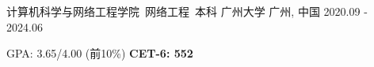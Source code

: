 

\begin{cventries}

  \cventry
    {计算机科学与网络工程学院\ 网络工程\ 本科} %
    {广州大学} %
    {广州, 中国} %
    {2020.09 - 2024.06} %
    {
      \begin{cvitems} %
        \item {GPA: 3.65/4.00 (前10\%) \hspace{1mm} \textbf{CET-6: 552}}
      \end{cvitems}
    }

\end{cventries}
